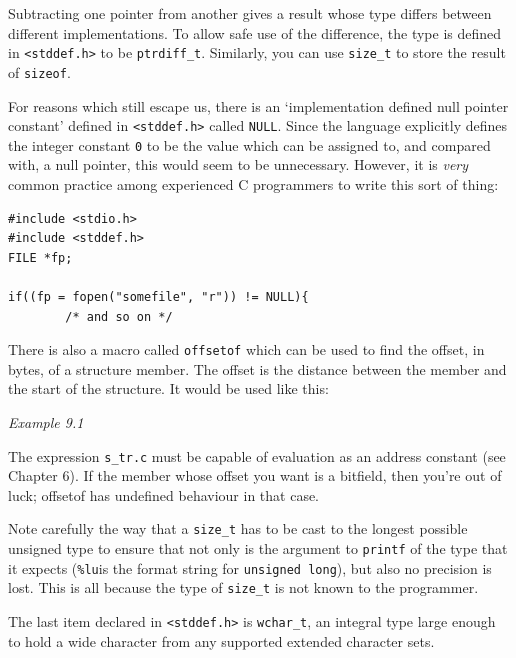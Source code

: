    Subtracting one pointer from another gives a result whose
    type differs between different implementations.  To allow
    safe use of the difference, the type is defined in
    \texttt{<stddef.h>} to be \texttt{ptrdiff\_t}.  Similarly, you
    can use \texttt{size\_t} to store the result of \texttt{sizeof}.


   For reasons which still escape us, there is an `implementation
    defined null pointer constant' defined in \texttt{<stddef.h>}
    called \texttt{NULL}.  Since the language explicitly
    defines the integer constant \texttt{0} to be the value which can be
    assigned to, and compared with, a null pointer, this would
    seem to be unnecessary.  However, it is \textit{very} common practice
    among experienced C programmers to write this sort of thing:


   \begin{Verbatim}
#include <stdio.h>
#include <stddef.h>
FILE *fp;

if((fp = fopen("somefile", "r")) != NULL){
        /* and so on */
\end{Verbatim}

   There is also a macro called \texttt{offsetof} which can be  used  to
    find  the  offset,  in  bytes,  of  a structure member.  The
    offset is the distance between the member and the  start  of
    the structure.  It would be used like this:


   \begin{center}\textit{Example 9.1}\end{center}


   The expression \texttt{s\_tr.c} must be capable of  evaluation  as  an
    address  constant  (see  Chapter 6).   If  the member whose
    offset you want is a bitfield,  then  you're  out  of  luck;
    offsetof has undefined behaviour in that case.


   Note carefully the way that a \texttt{size\_t} has to be cast  to  the
    longest  possible  unsigned  type to ensure that not only is the argument
    to \texttt{printf} of the type that it expects (\texttt{\%lu}is
    the  format string for \texttt{unsigned long}), but also no precision
    is lost.  This is all because the  type  of  \texttt{size\_t}  is  not
    known to the programmer.


   The last item declared in \texttt{<stddef.h>} is
    \texttt{wchar\_t}, an integral type large enough to hold a wide
    character from any supported extended character sets.


